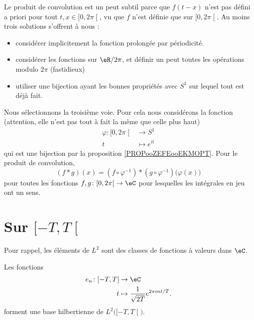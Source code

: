 Le produit de convolution est un peut subtil parce que \( f(t-x)\) n'est pas défini a priori pour tout \( t,x\in \mathopen[ 0 , 2\pi \mathclose[\), vu que \( f\) n'est définie que sur \( \mathopen[ 0 , 2\pi \mathclose[\). Au moins trois solutions s'offrent à nous :
\begin{itemize}
    \item 
       considérer implicitement la fonction prolongée par périodicité.
   \item
       considérer les fonctions sur \( \eR/2\pi\), et définir un peut toutes les opérations modulo \( 2\pi\) (fastidieux)
   \item
       utiliser une bijection ayant les bonnes propriétés avec \( S^1\) sur lequel tout est déjà fait.
\end{itemize}
Nous sélectionnons la troisième voie. Pour cela nous considérons la fonction (attention, elle n'est pas tout à fait la même que celle plus haut)
\begin{equation}
    \begin{aligned}
        \varphi\colon \mathopen[ 0 , 2\pi \mathclose[&\to S^1 \\
            t&\mapsto  e^{it} 
    \end{aligned}
\end{equation}
qui est une bijection par la proposition \ref{PROPooZEFEooEKMOPT}. Pour le produit de convolution,
\begin{equation}
    (f * g)(x)=(f\circ \varphi^{-1})*(g\circ\varphi^{-1})\big( \varphi(x) \big)
\end{equation}
pour toutes les fonctions \( f,g\colon \mathopen[ 0 , 2\pi \mathclose[\to \eC\) pour lesquelles les intégrales en jeu ont un sens.

\section{Sur \( \mathopen[ -T , T \mathclose[\)}

Pour rappel, les éléments de \( L^2\) sont des classes de fonctions à valeurs dans \( \eC\).

\begin{proposition}     \label{PROPooHNJZooGfRCfU}
    Les fonctions    
    \begin{equation}
        \begin{aligned}
            e_n\colon \mathopen[ -T , T \mathclose]&\to \eC \\
            t&\mapsto \frac{1}{ \sqrt{ 2T } } e^{2\pi int/T}. 
        \end{aligned}
    \end{equation}
    forment une base hilbertienne de \( L^2\big( \mathopen[ -T , T \mathclose[ \big)\).
\end{proposition}

